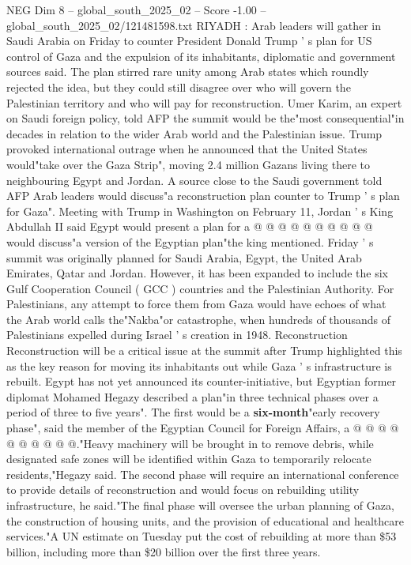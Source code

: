 \begin{textsample}{NEG Dim 8 – global\_south\_2025\_02 – Score -1.00 – global\_south\_2025\_02/121481598.txt}  \label{ex:f8_neg_377}
RIYADH : Arab leaders will gather in Saudi Arabia on Friday to counter President Donald Trump ' s plan for US control of Gaza and the expulsion of its inhabitants, diplomatic and government sources said.
The plan stirred rare unity among Arab states which roundly rejected the idea, but they could still disagree over who will govern the Palestinian territory and who will pay for reconstruction.
Umer Karim, an expert on Saudi foreign policy, told AFP the summit would be the"most consequential"in decades in relation to the wider Arab world and the Palestinian issue.
Trump provoked international outrage when he announced that the United States would"take over the Gaza Strip", moving 2.4 million Gazans living there to neighbouring Egypt and Jordan.
A source close to the Saudi government told AFP Arab leaders would discuss"a reconstruction plan counter to Trump ' s plan for Gaza".
Meeting with Trump in Washington on February 11, Jordan ' s King Abdullah II said Egypt would present a plan for a @ @ @ @ @ @ @ @ @ @ would discuss"a version of the Egyptian plan"the king mentioned.
Friday ' s summit was originally planned for Saudi Arabia, Egypt, the United Arab Emirates, Qatar and Jordan.
However, it has been expanded to include the six Gulf Cooperation Council ( GCC ) countries and the Palestinian Authority.
For Palestinians, any attempt to force them from Gaza would have echoes of what the Arab world calls the"Nakba"or catastrophe, when hundreds of thousands of Palestinians expelled during Israel ' s creation in 1948.
Reconstruction Reconstruction will be a critical issue at the summit after Trump highlighted this as the key reason for moving its inhabitants out while Gaza ' s infrastructure is rebuilt.
Egypt has not yet announced its counter-initiative, but Egyptian former diplomat Mohamed Hegazy described a plan"in three technical phases over a period of three to five years".
The first would be a \textbf{six-month}"early recovery phase", said the member of the Egyptian Council for Foreign Affairs, a @ @ @ @ @ @ @ @ @ @."Heavy machinery will be brought in to remove debris, while designated safe zones will be identified within Gaza to temporarily relocate residents,"Hegazy said.
The second phase will require an international conference to provide details of reconstruction and would focus on rebuilding utility infrastructure, he said."The final phase will oversee the urban planning of Gaza, the construction of housing units, and the provision of educational and healthcare services."A UN estimate on Tuesday put the cost of rebuilding at more than \$53 billion, including more than \$20 billion over the first three years.

\end{textsample}
